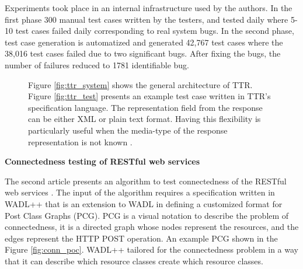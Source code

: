 \documentclass[english]{tktltiki}
\begin{document}
Experiments took place in an internal infrastructure used by the authors. In the first phase 300 manual test cases written by the testers, and tested daily where 5-10 test cases failed daily corresponding to real system bugs. In the second phase, test case generation is automatized and generated 42,767 test cases where the 38,016 test cases failed due to two significant bugs. After fixing the bugs, the number of failures reduced to 1781 identifiable bug. 
\begin{figure}[h]
	\centering
	\hfill%
	\caption{Figure \ref{fig:ttr_system} shows the general architecture of TTR. Figure \ref{fig:ttr_test} presents an example test case written in TTR's specification language. The representation field from the response can be either XML or plain text format. Having this flexibility is particularly useful when the media-type of the response representation is not known \cite{chakrabarti2009test}.}
\end{figure}

\textbf{Connectedness testing of RESTful web services}

The second article presents an algorithm to test connectedness of the RESTful web services \cite{chakrabarti2010connectedness}. The input of the algorithm requires a specification written in WADL++ that is an extension to WADL in defining a customized format for Post Class Graphs (PCG). PCG is a visual notation to describe the problem of connectedness, it is a directed graph whose nodes represent the resources, and the edges represent the HTTP POST operation. An example PCG shown in the Figure \ref{fig:conn_poc}. WADL++ tailored for the connectedness problem in a way that it can describe which resource classes create which resource classes.
\end{document}
